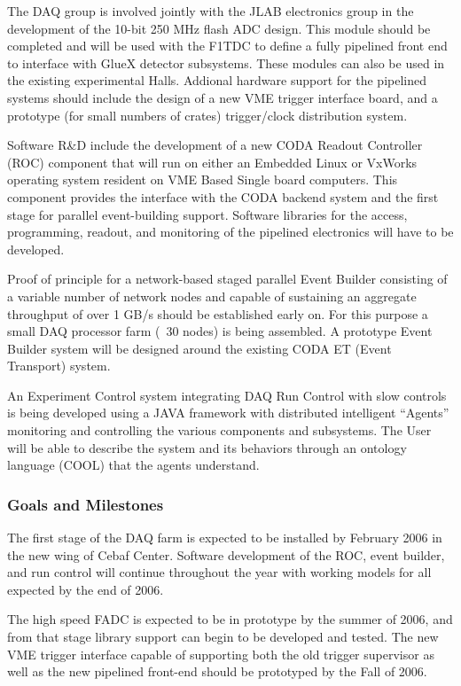 \documentclass[10pt]{article}
\begin{document}
The DAQ group is involved jointly with the JLAB electronics group in the 
development of the 10-bit 250 MHz flash ADC design. This module should be
completed and will be used with the F1TDC to define a fully pipelined front
end to interface with GlueX detector subsystems. These modules can also be
used in the existing experimental Halls. Addional hardware support for the 
pipelined systems should include the design of a new VME trigger interface 
board, and a prototype (for small numbers of crates) trigger/clock 
distribution system. 

Software R\&D include the development of a new CODA Readout Controller
(ROC) component that will run on either an Embedded Linux or VxWorks
operating system resident on VME Based Single board computers. This
component provides the interface with the CODA backend system and the
first stage for parallel event-building support. Software libraries for 
the access, programming, readout, and monitoring of the pipelined 
electronics will have to be developed.

Proof of principle for a network-based staged parallel Event Builder
consisting of a variable number of network nodes and capable of sustaining
an aggregate throughput of over 1 GB/s should be established early on. For
this purpose a small DAQ processor farm (~30 nodes) is being assembled. A
prototype Event Builder system will be designed around the existing CODA ET
(Event Transport) system. 

An Experiment Control system integrating DAQ Run Control with slow
controls is being developed using a JAVA framework with distributed
intelligent ``Agents'' monitoring and controlling the various components
and subsystems. The User will be able to describe the system and its
behaviors through an ontology language (COOL) that the agents understand.
 

\subsubsection*{Goals and Milestones}

The first stage of the DAQ farm is expected to be installed by February
2006 in the new wing of Cebaf Center. Software development of the ROC,
event builder, and run control will continue throughout the year with
working models for all expected by the end of 2006. 

The high speed FADC is expected to be in prototype by the summer of 2006,
and from that stage library support can begin to be developed and
tested. The new VME trigger interface capable of supporting both the old
trigger supervisor as well as the new pipelined front-end should be
prototyped by the Fall of 2006. 
\end{document}
